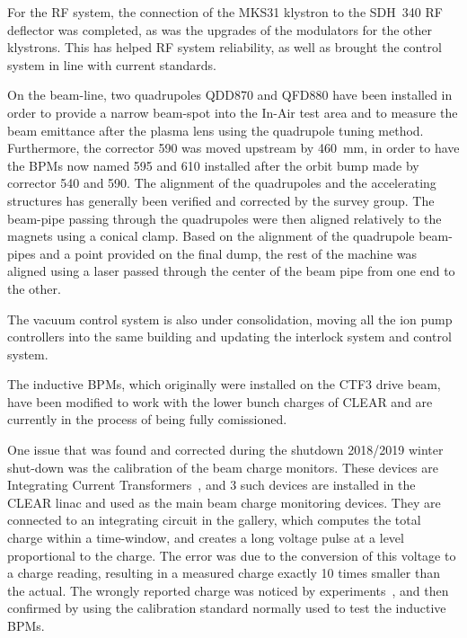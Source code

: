 \documentclass[a4paper,
               keeplastbox,   %
               ]{jacow}
\begin{document}
For the RF system, the connection of the MKS31 klystron to the SDH~340 RF deflector was completed, as was the upgrades of the modulators for the other klystrons.
This has helped RF system reliability, as well as brought the control system in line with current standards.


On the beam-line, two quadrupoles QDD870 and QFD880 have been installed in order to provide a narrow beam-spot into the In-Air test area and to measure the beam emittance after the plasma lens using the quadrupole tuning method.
Furthermore, the corrector 590 was moved upstream by 460~mm, in order to have the BPMs now named 595 and 610 installed after the orbit bump made by corrector 540 and 590.
The alignment of the quadrupoles and the accelerating structures has generally been verified and corrected by the survey group.
The beam-pipe passing through the quadrupoles were then aligned relatively to the magnets using a conical clamp.
Based on the alignment of the quadrupole beam-pipes and a point provided on the final dump, the rest of the machine was aligned using a laser passed through the center of the beam pipe from one end to the other.

The vacuum control system is also under consolidation, moving all the ion pump controllers into the same building and updating the interlock system and control system.

The inductive BPMs, which originally were installed on the CTF3 drive beam, have been modified to work with the lower bunch charges of CLEAR and are currently in the process of being fully comissioned.

One issue that was found and corrected during the shutdown 2018/2019 winter shut-down was the calibration of the beam charge monitors.
These devices are Integrating Current Transformers~\cite{BergozICT}, and 3 such devices are installed in the CLEAR linac and used as the main beam charge monitoring devices.
They are connected to an integrating circuit in the gallery, which computes the total charge within a time-window, and creates a long voltage pulse at a level proportional to the charge.
The error was due to the conversion of this voltage to a charge reading, resulting in a measured charge exactly 10 times smaller than the actual.
The wrongly reported charge was noticed by experiments~\cite{MarisTali:E-SEU,Antonio::IEEE-Kicks}, and then confirmed by using the calibration standard normally used to test the inductive BPMs.

\end{document}
